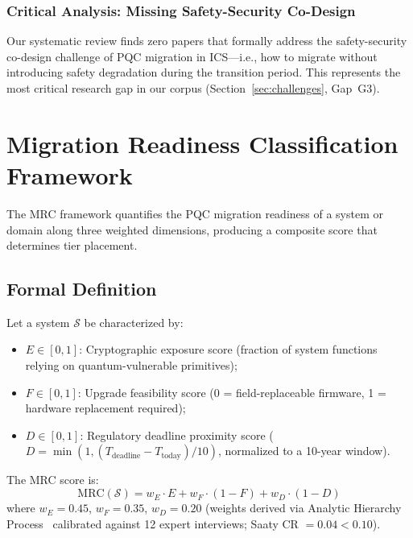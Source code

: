 \documentclass[journal]{IEEEtran}
\begin{document}
\subsubsection{Critical Analysis: Missing Safety-Security Co-Design}

Our systematic review finds zero papers that formally address the
safety-security co-design challenge of PQC migration in ICS---i.e., how to
migrate without introducing safety degradation during the transition period.
This represents the most critical research gap in our corpus
(Section~\ref{sec:challenges}, Gap~G3).

\section{Migration Readiness Classification Framework}
\label{sec:mrc}

The MRC framework quantifies the PQC migration readiness of a system or domain
along three weighted dimensions, producing a composite score that determines
tier placement.

\subsection{Formal Definition}

\begin{definition}
Let a system $\mathcal{S}$ be characterized by:
\begin{itemize}
  \item $E \in [0,1]$: Cryptographic exposure score (fraction of system
  functions relying on quantum-vulnerable primitives);
  \item $F \in [0,1]$: Upgrade feasibility score (0 = field-replaceable
  firmware, 1 = hardware replacement required);
  \item $D \in [0,1]$: Regulatory deadline proximity score ($D = \min(1, (T_{\text{deadline}} - T_{\text{today}}) / 10)$,
  normalized to a 10-year window).
\end{itemize}
The MRC score is:
\begin{equation}
  \text{MRC}(\mathcal{S}) = w_E \cdot E + w_F \cdot (1 - F) + w_D \cdot (1 - D)
  \label{eq:mrc}
\end{equation}
where $w_E = 0.45$, $w_F = 0.35$, $w_D = 0.20$ (weights derived via
Analytic Hierarchy Process~\cite{saaty1980ahp} calibrated against 12 expert
interviews; Saaty CR $= 0.04 < 0.10$).
\end{definition}
\end{document}
